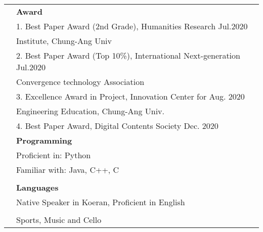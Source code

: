 \documentclass[letterpaper, 11pt]{article}
\begin{document}
\begin{longtable}{p{1.3in}p{4.8in}}
& \textbf{Award} \\
& \setlength{\leftskip}{10pt} 1. Best Paper Award (2nd Grade), Humanities Research \hfill Jul.2020 \\
& \setlength{\leftskip}{20pt} Institute, Chung-Ang Univ  \\
& \setlength{\leftskip}{10pt} 2. Best Paper Award (Top 10\%), International Next-generation \hfill Jul.2020 \\
& \setlength{\leftskip}{20pt} Convergence technology Association  \\
& \setlength{\leftskip}{10pt} 3. Excellence Award in Project, Innovation Center for \hfill Aug. 2020 \\
& \setlength{\leftskip}{20pt} Engineering Education, Chung-Ang Univ.  \\
& \setlength{\leftskip}{10pt} 4. Best Paper Award, Digital Contents Society \hfill Dec. 2020

\\

{\color{OliveGreen}{Skills}} 
& \textbf{Programming}\\
& Proficient in: Python \\
& Familiar with: Java, C++, C \\
& \\

& \textbf{Languages} \\
& Native Speaker in Koeran, Proficient in English \\
& \\




\nohyphens{\color{OliveGreen}{Other interests}} & Sports, Music and Cello\\


\end{longtable}
\end{document}
